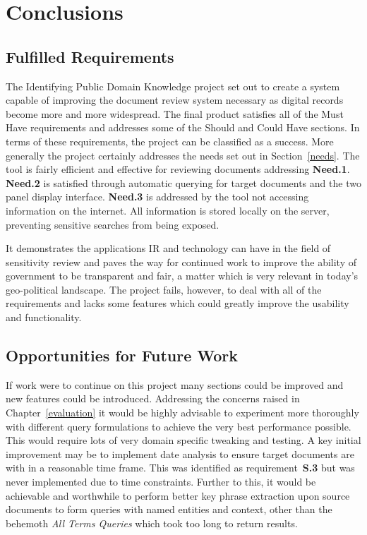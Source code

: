 \documentclass{l4proj}
\begin{document}
\chapter{Conclusions} \label{conclusion}
\section{Fulfilled Requirements}
The Identifying Public Domain Knowledge project set out to create a system capable of improving the document review system necessary as digital records become more and more widespread.
The final product satisfies all of the Must Have requirements and addresses some of the Should and Could Have sections. In terms of these requirements, the project can be classified as a success. More generally the project certainly addresses the needs set out in Section~\ref{needs}. The tool is fairly efficient and effective for reviewing documents addressing \textbf{Need.1}. \textbf{Need.2} is satisfied through automatic querying for target documents and the two panel display interface. \textbf{Need.3} is addressed by the tool not accessing information on the internet. All information is stored locally on the server, preventing sensitive searches from being exposed.

It demonstrates the applications IR and technology can have in the field of sensitivity review and paves the way for continued work to improve the ability of government to be transparent and fair, a matter which is very relevant in today's geo-political landscape. The project fails, however, to deal with all of the requirements and lacks some features which could greatly improve the usability and functionality.

\section{Opportunities for Future Work}
If work were to continue on this project many sections could be improved and new features could be introduced. Addressing the concerns raised in Chapter~\ref{evaluation} it would be highly advisable to experiment more thoroughly with different query formulations to achieve the very best performance possible. This would require lots of very domain specific tweaking and testing. A key initial improvement may be to implement date analysis to ensure target documents are with in a reasonable time frame. This was identified as requirement~\textbf{S.3} but was never implemented due to time constraints.
Further to this, it would be achievable and worthwhile to perform better key phrase extraction upon source documents to form queries with named entities and context, other than the behemoth \textit{All Terms Queries} which took too long to return results.
\end{document}
